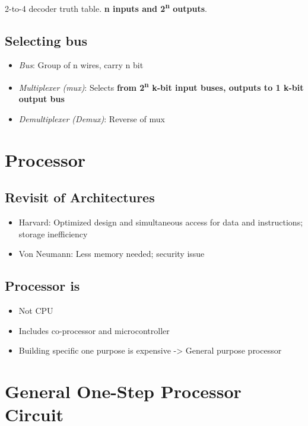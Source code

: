 \documentclass[11pt]{article}
\begin{document}
2-to-4 decoder truth table. \textbf{n inputs and 2\textsuperscript{n} outputs}.

\subsection{Selecting bus}
\label{sec:org703d9d1}

\begin{itemize}
\item \emph{Bus}: Group of n wires, carry n bit
\item \emph{Multiplexer (mux)}: Selects \textbf{from 2\textsuperscript{n} k-bit input buses, outputs to 1 k-bit output bus}
\item \emph{Demultiplexer (Demux)}: Reverse of mux
\end{itemize}

\section{Processor}
\label{sec:orgcd07648}

\subsection{Revisit of Architectures}
\label{sec:org4ff58a5}

\begin{itemize}
\item Harvard: Optimized design and simultaneous access for data and instructions; storage inefficiency
\item Von Neumann: Less memory needed; security issue
\end{itemize}

\subsection{Processor is}
\label{sec:orgbbd534d}

\begin{itemize}
\item Not CPU
\item Includes co-processor and microcontroller
\item Building specific one purpose is expensive -> General purpose processor
\end{itemize}

\section{General One-Step Processor Circuit}
\label{sec:orgf908c41}
\end{document}
